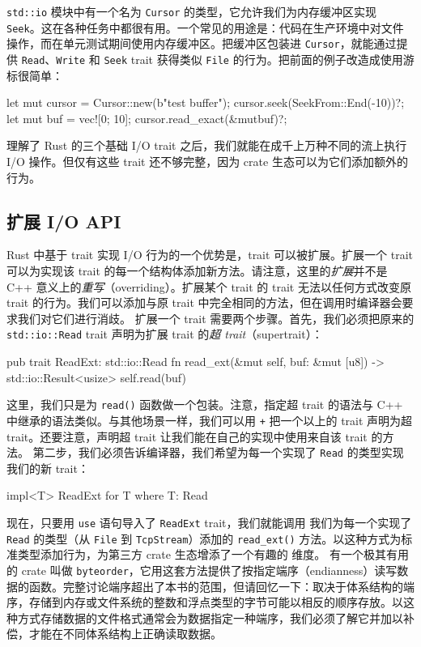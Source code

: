 \label{idx:idx_e0b8687f}
\texttt{std::io} 模块中有一个名为 \texttt{Cursor} 的类型，它允许我们为内存缓冲区实现 \texttt{Seek}。这在各种任务中都很有用。一个常见的用途是：代码在生产环境中对文件操作，而在单元测试期间使用内存缓冲区。把缓冲区包装进 \texttt{Cursor}，就能通过提供 \texttt{Read}、\texttt{Write} 和 \texttt{Seek} trait 获得类似 \texttt{File} 的行为。把前面的例子改造成使用游标很简单：
\begin{codebox}[rust]
let mut cursor = Cursor::new(b"test buffer");
cursor.seek(SeekFrom::End(-10))?;
let mut buf = vec![0; 10];
cursor.read_exact(&mutbuf)?;
\end{codebox}
理解了 Rust 的三个基础 I/\allowbreak{}O trait 之后，我们就能在成千上万种不同的流上执行 I/\allowbreak{}O 操作。但仅有这些 trait 还不够完整，因为 crate 生态可以为它们添加额外的行为。
\subsection{扩展 I/O API}
\label{idx:idx_d0720ad6}
Rust 中基于 trait 实现 I/\allowbreak{}O 行为的一个优势是，trait 可以被扩展。扩展一个 trait 可以为实现该 trait 的每一个结构体添加新方法。请注意，这里的\emph{扩展}并不是 C++ 意义上的\emph{重写}（overriding）。扩展某个 trait 的 trait 无法以任何方式改变原 trait 的行为。我们可以添加与原 trait 中完全相同的方法，但在调用时编译器会要求我们对它们进行消歧。
扩展一个 trait 需要两个步骤。首先，我们必须把原来的
\texttt{std::\allowbreak{}io::\allowbreak{}Read} trait 声明为扩展 trait 的\emph{超 trait}（supertrait）：
\begin{codebox}[rust]
pub trait ReadExt: std::io::Read {
    fn read_ext(&mut self, buf: &mut [u8])
     -> std::io::Result<usize> {
        self.read(buf)
    }
}
\end{codebox}
这里，我们只是为 \texttt{read()} 函数做一个包装。注意，指定超 trait 的语法与 C++ 中继承的语法类似。与其他场景一样，我们可以用 \texttt{+} 把一个以上的 trait 声明为超 trait。还要注意，声明超 trait 让我们能在自己的实现中使用来自该 trait 的方法。
第二步，我们必须告诉编译器，我们希望为每一个实现了 \texttt{Read} 的类型实现我们的新 trait：
\begin{codebox}[rust]
impl<T> ReadExt for T where T: Read {}
\end{codebox}
现在，只要用 \texttt{use} 语句导入了 \texttt{ReadExt} trait，我们就能调用
我们为每一个实现了 \texttt{Read} 的类型（从 \texttt{File} 到 \texttt{TcpStream}）添加的 \texttt{read\_ext()} 方法。以这种方式为标准类型添加行为，为第三方 crate 生态增添了一个有趣的
维度。
有一个极其有用的 crate 叫做 \texttt{byteorder}，它用这套方法提供了按指定端序（endianness）读写数据的函数。完整讨论端序超出了本书的范围，但请回忆一下：取决于体系结构的端序，存储到内存或文件系统的整数和浮点类型的字节可能以相反的顺序存放。以这种方式存储数据的文件格式通常会为数据指定一种端序，我们必须了解它并加以补偿，才能在不同体系结构上正确读取数据。
